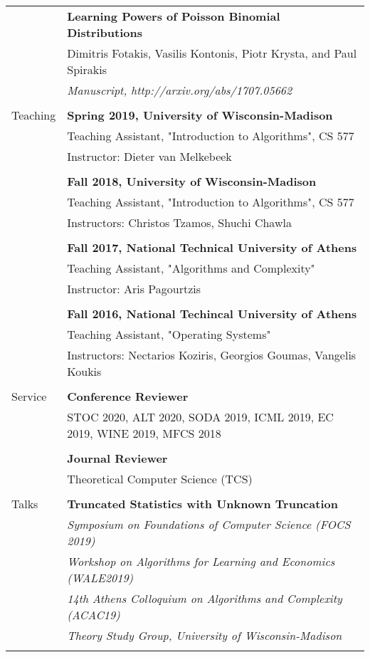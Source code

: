 \documentclass[letterpaper,11pt,oneside]{article}
\begin{document}
\begin{longtable}{@{} l l}
     & \textbf{Learning Powers of Poisson Binomial Distributions} \\
     & Dimitris Fotakis, Vasilis Kontonis, Piotr Krysta, and Paul Spirakis\\
     & \emph{Manuscript, http://arxiv.org/abs/1707.05662} \\
     & \\

  \Large{Teaching}
     & \textbf{Spring 2019, University of Wisconsin-Madison} \\
     & Teaching Assistant, "Introduction to Algorithms", CS 577 \\
     & Instructor: Dieter van Melkebeek \\
     & \\

     &\textbf{Fall 2018, University of Wisconsin-Madison} \\
     & Teaching Assistant, "Introduction to Algorithms", CS 577 \\
     & Instructors: Christos Tzamos, Shuchi Chawla \\
     & \\

     &\textbf{Fall 2017, National Technical University of Athens} \\
     & Teaching Assistant, "Algorithms and Complexity" \\
     & Instructor: Aris Pagourtzis \\
     & \\

     &\textbf{Fall 2016, National Techincal University of Athens} \\
     & Teaching Assistant, "Operating Systems" \\
     & Instructors: Nectarios Koziris, Georgios Goumas, Vangelis Koukis\\
     & \\

  \Large{Service} &\textbf{Conference Reviewer}\\

    & STOC 2020, ALT 2020, SODA 2019, ICML 2019, EC 2019, WINE 2019, MFCS 2018 \\
    &\\

    &\textbf{Journal Reviewer}\\
    & Theoretical Computer Science (TCS)\\
    & \\

 \Large{Talks}
 &\textbf{Truncated Statistics with Unknown Truncation}\\
 &\emph{Symposium on Foundations of Computer Science (FOCS 2019)}\\
 &\emph{Workshop on Algorithms for Learning and Economics (WALE2019)}\\
 &\emph{14th Athens Colloquium on Algorithms and Complexity (ACAC19)}\\
 &\emph{Theory Study Group, University of Wisconsin-Madison}\\
 &\\


\end{longtable}
\end{document}
